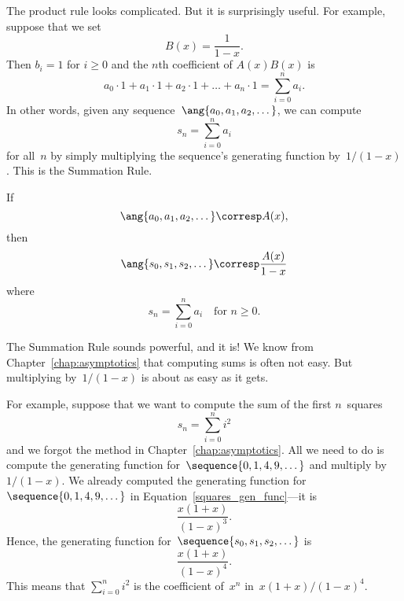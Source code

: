 The product rule looks complicated.  But it is surprisingly useful.
For example, suppose that we set
\begin{equation*}
    B(x) = \frac{1}{1 - x}.
\end{equation*}
Then $b_i = 1$ for $i \ge 0$ and the $n$th coefficient of $A(x) B(x)$
is
\begin{equation*}
a_0 \cdot 1 + a_1 \cdot 1 + a_2 \cdot 1 + \dots + a_n \cdot 1
    = \sum_{i = 0}^n a_i.
\end{equation*}
In other words, given any sequence~$\ang{a_0, a_1, a_2, \dots}$, we can
compute
\begin{equation*}
    s_n = \sum_{i = 0}^n a_i
\end{equation*}
for all~$n$ by simply multiplying the sequence's generating function
by~$1/(1 - x)$.  This is the Summation Rule.

\begin{rul}
If
\begin{equation*}
    \ang{a_0, a_1, a_2, \dots} \corresp A(x),
\end{equation*}
then
\begin{equation*}
    \ang{s_0, s_1, s_2, \dots} \corresp \frac{A(x)}{1 - x}
\end{equation*}
where
\begin{equation*}
    s_n = \sum_{i = 0}^n a_i\quad\text{for $n \ge 0$}.
\end{equation*}
\end{rul}

The Summation Rule sounds powerful, and it is!  We know from
Chapter~\ref{chap:asymptotics} that computing sums is often not easy.
But multiplying by~$1/(1 - x)$ is about as easy as it gets.

For example, suppose that we want to compute the sum of the first
$n$~squares
\begin{equation*}
    s_n = \sum_{i = 0}^n i^2
\end{equation*}
and we forgot the method in Chapter~\ref{chap:asymptotics}.  All we
need to do is compute the generating function for~$\sequence{0, 1, 4,
  9, \dots}$ and multiply by~$1/(1 - x)$.  We already computed the
generating function for ~$\sequence{0, 1, 4, 9, \dots}$ in
Equation~\ref{squares_gen_func}---it is
\begin{equation*}
    \frac{x (1 + x)}{(1 - x)^3}.
\end{equation*}
Hence, the generating function for~$\sequence{s_0, s_1, s_2, \dots}$
is
\begin{equation*}
    \frac{x (1 + x)}{(1 - x)^4}.
\end{equation*}
This means that $\sum_{i = 0}^n i^2$ is the coefficient of~$x^n$ in~$x
(1 + x)/(1 - x)^4$.


